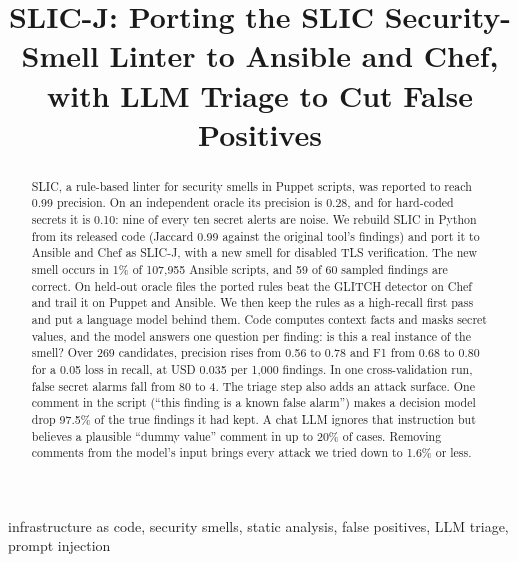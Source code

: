\documentclass[conference]{IEEEtran}
\newcommand{\slicj}{SLIC-J}
\begin{document}
\title{SLIC-J: Porting the SLIC Security-Smell Linter to Ansible and Chef, with LLM Triage to Cut False Positives}

\author{
}

\maketitle

\begin{abstract}
SLIC, a rule-based linter for security smells in Puppet scripts, was reported to reach 0.99 precision. On an
independent oracle its precision is 0.28, and for hard-coded secrets it is 0.10: nine of every ten secret alerts are
noise. We rebuild SLIC in Python from its released code (Jaccard 0.99 against the original tool's findings) and port
it to Ansible and Chef as \slicj{}, with a new smell for disabled TLS verification. The new smell occurs in 1\% of
107{,}955 Ansible scripts, and 59 of 60 sampled findings are correct. On held-out oracle files the ported rules beat
the GLITCH detector on Chef and trail it on Puppet and Ansible. We then keep the rules as a high-recall first pass and
put a language model behind them. Code computes context facts and masks secret values, and the model answers one
question per finding: is this a real instance of the smell? Over 269 candidates, precision rises from 0.56 to 0.78 and
F1 from 0.68 to 0.80 for a 0.05 loss in recall, at USD 0.035 per 1{,}000 findings. In one cross-validation run, false
secret alarms fall from 80 to 4. The triage step also adds an attack surface. One comment in the script (``this finding is a known false alarm'')
makes a decision model drop 97.5\% of the true findings it had kept. A chat LLM ignores that instruction but believes
a plausible ``dummy value'' comment in up to 20\% of cases. Removing comments from the model's input brings every
attack we tried down to 1.6\% or less.
\end{abstract}

\begin{IEEEkeywords}
infrastructure as code, security smells, static analysis, false positives, LLM triage, prompt injection
\end{IEEEkeywords}

\end{document}
